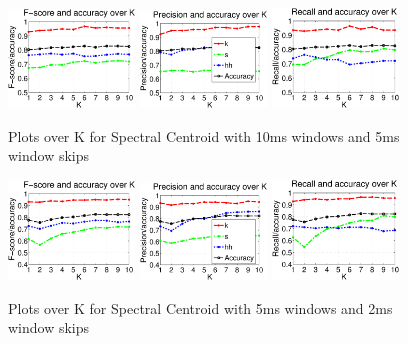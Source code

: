 		\begin{figure}
			\centering\includegraphics[width=0.3\textwidth]{tex/appendices/test/scentroid105FP.png}
			\centering\includegraphics[width=0.3\textwidth]{tex/appendices/test/scentroid105_P.png}
			\centering\includegraphics[width=0.3\textwidth]{tex/appendices/test/scentroid105_R.png}
				
				\caption{Plots over K for Spectral Centroid with 10ms windows and 5ms window skips}
		\end{figure}
		\begin{figure}
			\centering\includegraphics[width=0.3\textwidth]{tex/appendices/test/scentroid52FP.png}
			\centering\includegraphics[width=0.3\textwidth]{tex/appendices/test/scentroid52_P.png}
			\centering\includegraphics[width=0.3\textwidth]{tex/appendices/test/scentroid52_R.png}
				
				\caption{Plots over K for Spectral Centroid with 5ms windows and 2ms window skips}
		\end{figure}\clearpage
		
